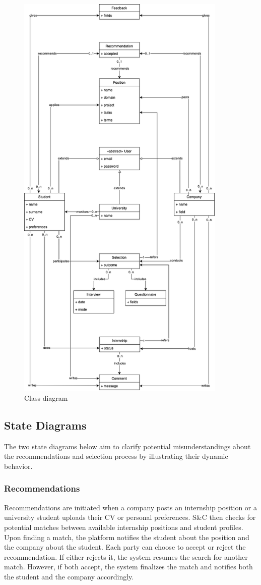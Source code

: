 \begin{figure}
    \centering
    \includegraphics[width=10cm]{images/class-diagram.png}
    \caption{Class diagram}
\end{figure}

\subsection{State Diagrams}
The two state diagrams below aim to clarify potential misunderstandings about the recommendations and selection process by illustrating their dynamic behavior.

\subsubsection{Recommendations}
Recommendations are initiated when a company posts an internship position or a university student uploads their CV or personal preferences.
S\&C then checks for potential matches between available internship positions and student profiles.
Upon finding a match, the platform notifies the student about the position and the company about the student.
Each party can choose to accept or reject the recommendation.
If either rejects it, the system resumes the search for another match.
However, if both accept, the system finalizes the match and notifies both the student and the company accordingly.

